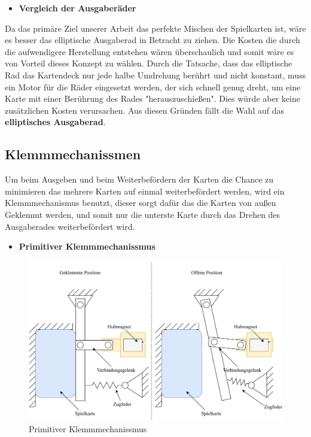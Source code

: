 \begin{itemize}
    \item \textbf{Vergleich der Ausgaberäder}
\end{itemize}

Da das primäre Ziel unserer Arbeit das perfekte Mischen der Spielkarten ist, wäre es besser das elliptische Ausgaberad in Betracht zu ziehen. Die Kosten
die durch die aufwendigere Herstellung entstehen wären überschaulich und somit wäre es von Vorteil dieses Konzept zu wählen. Durch die Tatsache, dass das elliptische Rad
das Kartendeck nur jede halbe Umdrehung berührt und nicht konstant, muss ein Motor für die Räder eingesetzt werden, der sich schnell genug dreht, um eine Karte mit einer Berührung
des Rades "herauszuschießen". Dies würde aber keine zusätzlichen Kosten verursachen. Aus diesen Gründen fällt die Wahl auf das \textbf{elliptisches Ausgaberad}. \\

\subsection{Klemmmechanissmen}
Um beim Ausgeben und beim Weiterbefördern der Karten die Chance zu minimieren das mehrere Karten auf einmal weiterbefördert werden, wird ein
Klemmmechanismus benutzt, dieser sorgt dafür das die Karten von außen Geklemmt werden, und somit nur die unterste Karte durch das Drehen des
Ausgaberades weiterbefördert wird.

\begin{itemize}
    \item \textbf{Primitiver Klemmmechanissmus}
\end{itemize}

\begin{figure}[H]
    \centering
    \includegraphics[scale=0.9,page=1]{fig/mech/Klemmmechanissmus1}
    \caption{Primitiver Klemmmechanissmus}
\end{figure}

